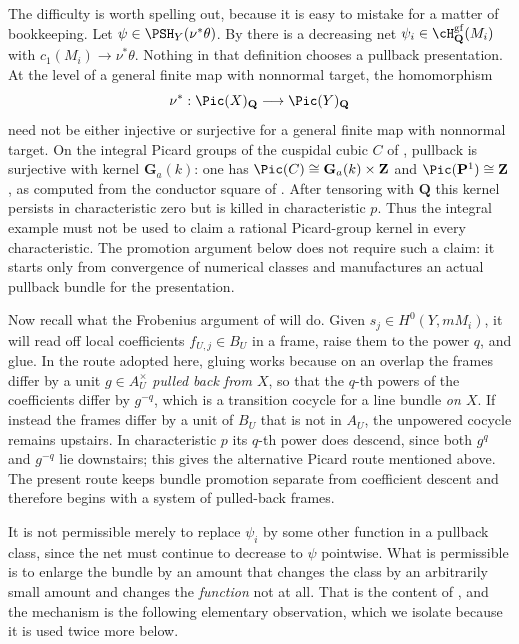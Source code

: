 The difficulty is worth spelling out, because it is easy to mistake for a
matter of bookkeeping.  Let $\psi\in\PSH_Y(\nu^*\theta)$.  By
 there is a decreasing net
$\psi_i\in\cH^{\mathrm{gf}}_{\mathbf Q}(M_i)$ with
$c_1(M_i)\to\nu^*\theta$.  Nothing in that definition chooses a pullback
presentation.  At the level of a general finite map with nonnormal target,
the homomorphism
\[
 \nu^*:\Pic(X)_{\mathbf Q}\longrightarrow\Pic(Y)_{\mathbf Q}
\]
need not be either injective or surjective for a general finite map with
nonnormal target.  On the integral Picard groups of the cuspidal cubic
$C$ of , pullback is surjective with kernel
$\mathbf G_a(k)$: one has
$\Pic(C)\cong\mathbf G_a(k)\times\mathbf Z$ and
$\Pic(\mathbf P^1)\cong\mathbf Z$, as computed from the conductor square
of .  After tensoring with $\mathbf Q$ this
kernel persists in characteristic zero but is killed in characteristic
$p$.  Thus the integral example must not be used to claim a rational
Picard-group kernel in every characteristic.  The promotion argument below
does not require such a claim: it starts only from convergence of numerical
classes and manufactures an actual pullback bundle for the presentation.

Now recall what the Frobenius argument of  will
do.  Given $s_j\in H^0(Y,mM_i)$, it will read off local coefficients
$f_{U,j}\in B_U$ in a frame, raise them to the power $q$, and glue.
In the route adopted here, gluing works because on an overlap the frames
differ by a unit
$g\in A_U^\times$ \emph{pulled back from $X$}, so that the $q$-th
powers of the coefficients differ by $g^{-q}$, which is a transition
cocycle for a line bundle \emph{on $X$}.  If instead the frames differ by
a unit of $B_U$ that is not in $A_U$, the unpowered cocycle remains
upstairs.  In characteristic $p$ its $q$-th power does descend, since both
$g^q$ and $g^{-q}$ lie downstairs; this gives the alternative Picard route
mentioned above.  The present route keeps bundle promotion separate from
coefficient descent and therefore begins with a system of pulled-back
frames.

It is not permissible merely to replace $\psi_i$ by some other function in
a pullback class, since the net must continue to decrease to $\psi$
pointwise.  What is permissible is
to enlarge the bundle by an amount that changes the class by an arbitrarily
small amount and changes the \emph{function} not at all.  That is the
content of , and the mechanism is
the following elementary observation, which we isolate because it is used
twice more below.


